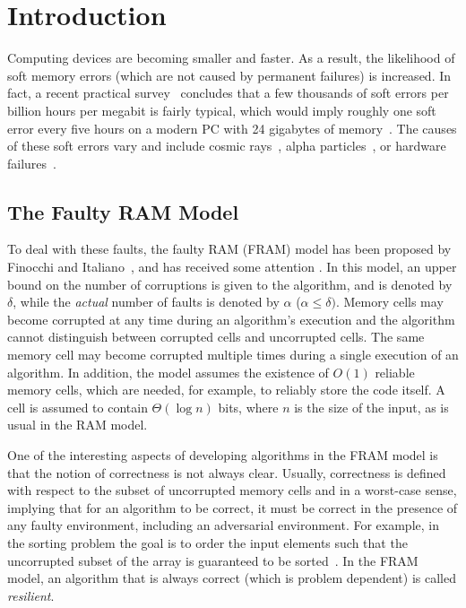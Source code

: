 \documentclass{llncs}
\begin{document}
\section{Introduction}
\label{sec:introduction}

Computing devices are becoming smaller and faster. As a result, the likelihood of soft memory errors (which are not caused by permanent failures) is increased. In fact, a recent practical survey~\cite{soft_error_rate} concludes that a few thousands of soft errors per billion hours per megabit is fairly typical, which would imply roughly one soft error every five hours on a modern PC with 24 gigabytes of memory~\cite{CDK11}. The causes of these soft errors vary and include cosmic rays~\cite{radiation}, alpha particles~\cite{alpha_particles}, or hardware failures~\cite{hardware_errors}.

\subsection{The Faulty RAM Model}

To deal with these faults, the faulty RAM (FRAM) model has been proposed by Finocchi and Italiano~\cite{resilient_data_structures}, and has received some attention \linebreak \cite{optimal_resilient_dictionaries,resilient_and_external_memory,resilient_counters,dynamic_programming,resilient_sorting,resilient_dictionaries,kd_trees,resilient_priority_queues}. \linebreak In this model, an upper bound on the number of corruptions is given to the algorithm, and is denoted by $\delta$, while the \emph{actual} number of faults is denoted by $\alpha$ ($\alpha \leq \delta)$. Memory cells may become corrupted at any time during an algorithm's execution and the algorithm cannot distinguish between corrupted cells and uncorrupted cells. The same memory cell may become corrupted multiple times during a single execution of an algorithm. In addition, the model assumes the existence of $O(1)$ reliable memory cells, which are needed, for example, to reliably store the code itself. A cell is assumed to contain $\Theta(\log n)$ bits, where $n$ is the size of the input, as is usual in the RAM model.

One of the interesting aspects of developing algorithms in the FRAM model is that the notion of correctness is not always clear. Usually, correctness is defined with respect to the subset of uncorrupted memory cells and in a worst-case sense, implying that for an algorithm to be correct, it must be correct in the presence of any faulty environment, including an adversarial environment. For example, in the sorting problem the goal is to order the input elements such that the uncorrupted subset of the array is guaranteed to be sorted~\cite{resilient_data_structures}. In the FRAM model, an algorithm that is always correct (which is problem dependent) is called \emph{resilient}.
\end{document}
